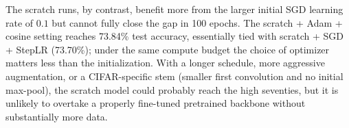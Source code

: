 \documentclass[10pt,a4paper]{article}
\begin{document}
The scratch runs, by contrast, benefit more from the larger initial SGD learning rate of $0.1$ but cannot fully close the gap in 100 epochs. The scratch + Adam + cosine setting reaches 73.84\% test accuracy, essentially tied with scratch + SGD + StepLR (73.70\%); under the same compute budget the choice of optimizer matters less than the initialization. With a longer schedule, more aggressive augmentation, or a CIFAR-specific stem (smaller first convolution and no initial max-pool), the scratch model could probably reach the high seventies, but it is unlikely to overtake a properly fine-tuned pretrained backbone without substantially more data.
\end{document}
